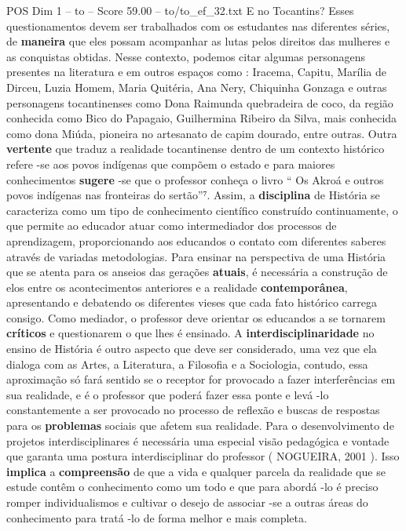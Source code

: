 \begin{textsample}{POS Dim 1 – to – Score 59.00 – to/to\_ef\_32.txt}
E no Tocantins?
Esses questionamentos devem ser trabalhados com os estudantes nas diferentes séries, de \textbf{maneira} que eles possam acompanhar as lutas pelos direitos das mulheres e as conquistas obtidas.
Nesse contexto, podemos citar algumas personagens presentes na literatura e em outros espaços como : Iracema, Capitu, Marília de Dirceu, Luzia Homem, Maria Quitéria, Ana Nery, Chiquinha Gonzaga e outras personagens tocantinenses como Dona Raimunda quebradeira de coco, da região conhecida como Bico do Papagaio, Guilhermina Ribeiro da Silva, mais conhecida como dona Miúda, pioneira no artesanato de capim dourado, entre outras.
Outra \textbf{vertente} que traduz a realidade tocantinense dentro de um contexto histórico refere -se aos povos indígenas que compõem o estado e para maiores conhecimentos \textbf{sugere} -se que o professor conheça o livro “ Os Akroá e outros povos indígenas nas fronteiras do sertão”⁷.
Assim, a \textbf{disciplina} de História se caracteriza como um tipo de conhecimento científico construído continuamente, o que permite ao educador atuar como intermediador dos processos de aprendizagem, proporcionando aos educandos o contato com diferentes saberes através de variadas metodologias.
Para ensinar na perspectiva de uma História que se atenta para os anseios das gerações \textbf{atuais}, é necessária a construção de elos entre os acontecimentos anteriores e a realidade \textbf{contemporânea}, apresentando e debatendo os diferentes vieses que cada fato histórico carrega consigo.
Como mediador, o professor deve orientar os educandos a se tornarem \textbf{críticos} e questionarem o que lhes é ensinado.
A \textbf{interdisciplinaridade} no ensino de História é outro aspecto que deve ser considerado, uma vez que ela dialoga com as Artes, a Literatura, a Filosofia e a Sociologia, contudo, essa aproximação só fará sentido se o receptor for provocado a fazer interferências em sua realidade, e é o professor que poderá fazer essa ponte e levá -lo constantemente a ser provocado no processo de reflexão e buscas de respostas para os \textbf{problemas} sociais que afetem sua realidade.
Para o desenvolvimento de projetos interdisciplinares é necessária uma especial visão pedagógica e vontade que garanta uma postura interdisciplinar do professor ( NOGUEIRA, 2001 ).
Isso \textbf{implica} a \textbf{compreensão} de que a vida e qualquer parcela da realidade que se estude contêm o conhecimento como um todo e que para abordá -lo é preciso romper individualismos e cultivar o desejo de associar -se a outras áreas do conhecimento para tratá -lo de forma melhor e mais completa.

\end{textsample}
